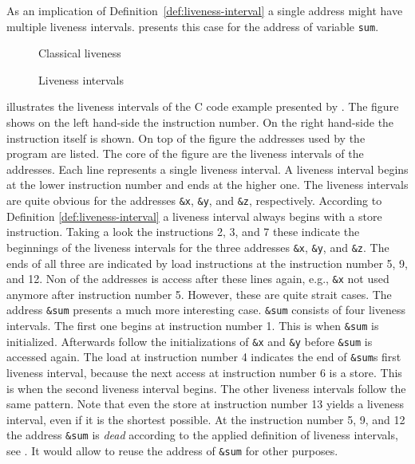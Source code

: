 \documentclass[onecolumn, openright, master, english, signatures]{dbrgrptt}
\begin{document}
\begin{remark}
As an implication of Definition~\ref{def:liveness-interval} a single address might have multiple liveness intervals.  presents this case for the address of variable \texttt{sum}.
\end{remark}

\begin{figure}[!ht]
  \centering
  
  \caption{Classical liveness}
  \label{fig:liveness-classical}
\end{figure}

\begin{figure}[!ht]
  \centering
  
  \caption{Liveness intervals}
  \label{fig:liveness-intervals}
\end{figure}

 illustrates the liveness intervals of the C code example presented by . The figure shows on the left hand-side the instruction number. On the right hand-side the instruction itself is shown. On top of the figure the addresses used by the program are listed. The core of the figure are the liveness intervals of the addresses. Each line represents a single liveness interval. A liveness interval begins at the lower instruction number and ends at the higher one. The liveness intervals are quite obvious for the addresses \texttt{\&x}, \texttt{\&y}, and \texttt{\&z}, respectively. According to Definition \ref{def:liveness-interval} a liveness interval always begins with a store instruction. Taking a look the instructions 2, 3, and 7 these indicate the beginnings of the liveness intervals for the three addresses \texttt{\&x}, \texttt{\&y}, and \texttt{\&z}. The ends of all three are indicated by load instructions at the instruction number 5, 9, and 12. Non of the addresses is access after these lines again, e.g., \texttt{\&x} not used anymore after instruction number 5. However, these are quite strait cases. The address \texttt{\&sum} presents a much more interesting case. \texttt{\&sum} consists of four liveness intervals. The first one begins at instruction number 1. This is when \texttt{\&sum} is initialized. Afterwards follow the initializations of \texttt{\&x} and \texttt{\&y} before \texttt{\&sum} is accessed again. The load at instruction number 4 indicates the end of \texttt{\&sum}s first liveness interval, because the next access at instruction number 6 is a store. This is when the second liveness interval begins. The other liveness intervals follow the same pattern. Note that even the store at instruction number 13 yields a liveness interval, even if it is the shortest possible. At the instruction number 5, 9, and 12 the address \texttt{\&sum} is \emph{dead} according to the applied definition of liveness intervals, see . It would allow to reuse the address of \texttt{\&sum} for other purposes.
\end{document}
